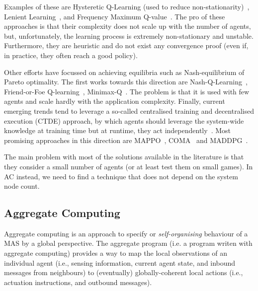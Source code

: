 \documentclass[11pt]{article}
\begin{document}
Examples of these are Hysteretic Q-Learning (used to reduce non-stationarity)~\cite{hysteretic-q}, 
 Lenient Learning~\cite{DBLP:journals/jmlr/WeiL16}, and Frequency Maximum Q-value~\cite{DBLP:conf/atal/KaisersT10}.
%
The pro of these approaches is that their complexity does not scale up with the number of agents, 
 but, unfortunately, the learning process is extremely non-stationary and unstable.
% 
Furthermore, they are heuristic and do not exist any convergence proof (even if, in practice, they often reach a good policy).

Other efforts have focussed on achieving equilibria such as Nash-equilibrium of Pareto optimality.
 The first works towards this direction are Nash-Q-Learning~\cite{nash-q}, Friend-or-Foe Q-learning~\cite{DBLP:conf/icml/Littman01}, Minimax-Q~\cite{DBLP:conf/icml/Littman94}.
The problem is that it is used with few agents and scale hardly with the application complexity.
%
Finally, current emerging trends tend to leverage a so-called centralised training and decentralised execution (CTDE) approach, by which 
 agents should leverage the system-wide knowledge at training time but at runtime, they act independently~\cite{DBLP:journals/aamas/Hernandez-LealK19}.
 Most promising approaches in this direction are MAPPO~\cite{DBLP:journals/corr/abs-2103-01955}, COMA~\cite{DBLP:journals/corr/FoersterFANW17} and MADDPG~\cite{DBLP:conf/nips/LoweWTHAM17}.
 
The main problem with most of the solutions available in the literature is that they consider a small number of agents (or at least test them on small games).
 In AC instead, we need to find a technique that does not depend on the system node count.
\subsection{Aggregate Computing}

Aggregate computing is an approach to specify or \emph{self-organising} behaviour of a MAS by a global perspective.
%
The aggregate program (i.e. a program writen with aggregate computing) provides a way to map the local observations of an individual agent (i.e., sensing information, current agent state, and inbound messages from neighbours) to (eventually) globally-coherent local actions
 (i.e., actuation instructions, and outbound messages).
%
\end{document}
